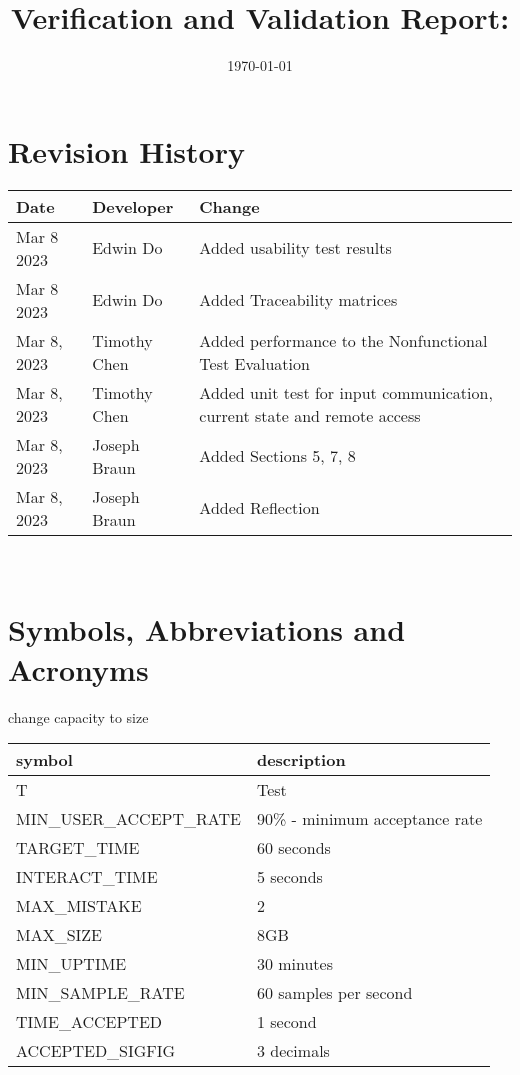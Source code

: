 \documentclass[12pt, titlepage]{article}
\begin{document}
\title{Verification and Validation Report: \progname} 
\author{\authname}
\date{\today}
	
\maketitle


\section{Revision History}


\begin{tabularx}{\textwidth}{p{3cm}p{3cm}X}
\toprule {\bf Date} & {\bf Developer} & {\bf Change}\\
\midrule
Mar 8 2023 & Edwin Do & Added usability test results \\
Mar 8 2023 & Edwin Do & Added Traceability matrices \\
Mar 8, 2023 & Timothy Chen & Added performance to the Nonfunctional Test Evaluation\\
Mar 8, 2023 & Timothy Chen & Added unit test for input communication, current state and remote access\\
Mar 8, 2023 & Joseph Braun & Added Sections 5, 7, 8 \\
Mar 8, 2023 & Joseph Braun & Added Reflection \\
\bottomrule
\end{tabularx}

~\newpage

\section{Symbols, Abbreviations and Acronyms}
change capacity to size

\renewcommand{\arraystretch}{1.2}
\begin{tabular}{l l} 
  \toprule		
  \textbf{symbol} & \textbf{description}\\
  \midrule 
  T & Test\\
  MIN\_USER\_ACCEPT\_RATE & 90\% - minimum acceptance rate\\
  TARGET\_TIME & 60 seconds \\
  INTERACT\_TIME & 5 seconds \\
  MAX\_MISTAKE & 2 \\
  MAX\_SIZE & 8GB \\ 
  MIN\_UPTIME & 30 minutes \\ 
  MIN\_SAMPLE\_RATE & 60 samples per second\\
  TIME\_ACCEPTED & 1 second \\
  ACCEPTED\_SIGFIG & 3 decimals \\
  \bottomrule
\end{tabular}\\
\end{document}
